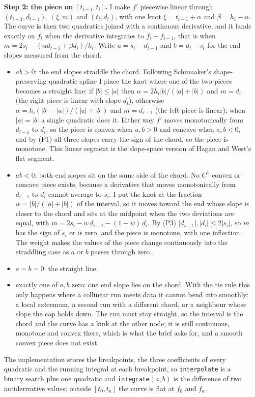 \documentclass[10pt]{article}
\newcommand{\code}[1]{\texttt{#1}}
\begin{document}
\textbf{Step 2: the piece on $[t_{i-1},t_i]$.} I make $f'$ piecewise linear through $(t_{i-1},d_{i-1})$, $(\xi,m)$ and $(t_i,d_i)$,
with one knot $\xi=t_{i-1}+\alpha$ and $\beta=h_i-\alpha$. The curve is then two quadratics joined with a continuous derivative, and it
lands exactly on $f_i$ when the derivative integrates to $f_i-f_{i-1}$, that is when
$m=2s_i-(\alpha d_{i-1}+\beta d_i)/h_i$. Write $a=s_i-d_{i-1}$ and $b=d_i-s_i$ for the end slopes measured from the chord.
\begin{itemize}\setlength{\itemsep}{1pt}\setlength{\topsep}{2pt}
\item $ab>0$: the end slopes straddle the chord. Following Schumaker's shape-preserving quadratic spline I place the knot where one of the
two pieces becomes a straight line: if $|b|\le|a|$ then $\alpha=2h_i|b|/(|a|+|b|)$ and $m=d_i$ (the right piece is linear with slope
$d_i$), otherwise $\alpha=h_i(|b|-|a|)/(|a|+|b|)$ and $m=d_{i-1}$ (the left piece is linear); when $|a|=|b|$ a single quadratic does it.
Either way $f'$ moves monotonically from $d_{i-1}$ to $d_i$, so the piece is convex when $a,b>0$ and concave when $a,b<0$, and by (P1)
all three slopes carry the sign of the chord, so the piece is monotone. This linear segment is the slope-space version of Hagan and
West's flat segment.
\item $ab<0$: both end slopes sit on the same side of the chord. No $C^1$ convex or concave piece exists, because a derivative that
moves monotonically from $d_{i-1}$ to $d_i$ cannot average to $s_i$. I put the knot at the fraction $w=|b|/(|a|+|b|)$ of the interval,
so it moves toward the end whose slope is closer to the chord and sits at the midpoint when the two deviations are equal, with
$m=2s_i-w\,d_{i-1}-(1-w)\,d_i$. By (P3) $|d_{i-1}|,|d_i|\le 2|s_i|$, so $m$ has the sign of $s_i$ or is zero, and the piece is monotone,
with one inflection. The weight makes the values of the piece change continuously into the straddling case as $a$ or $b$ passes through zero.
\item $a=b=0$: the straight line.
\item exactly one of $a,b$ zero: one end slope lies on the chord. With the tie rule this only happens where a collinear run meets
data it cannot bend into smoothly: a local extremum, a second run with a different chord, or a neighbour whose slope the cap holds
down. The run must stay straight, so the interval is the chord and the curve has a kink at the other node; it is still continuous,
monotone and convex there, which is what the brief asks for, and a smooth convex piece does not exist.
\end{itemize}
The implementation stores the breakpoints, the three coefficients of every quadratic and the running integral at each breakpoint, so
\code{interpolate} is a binary search plus one quadratic and \code{integrate}$(a,b)$ is the difference of two antiderivative values;
outside $[t_0,t_n]$ the curve is flat at $f_0$ and $f_n$.
\end{document}
